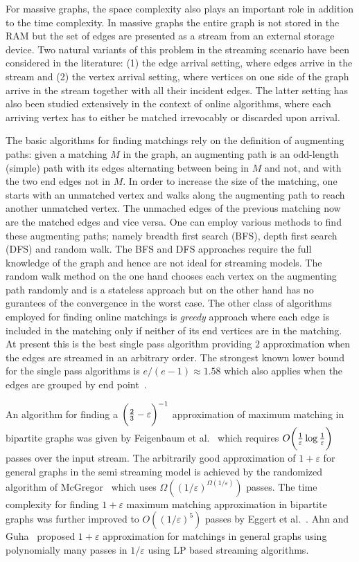 For massive graphs, the space complexity also plays an important role in addition to the time complexity. In massive graphs the entire graph is not stored in the RAM but the set of edges are presented as a stream from an external storage device. Two natural variants of this problem in the streaming scenario have been considered in the literature: (1) the edge arrival setting, where edges arrive in the stream and (2) the vertex arrival setting, where vertices on one
side of the graph arrive in the stream together with all their incident edges. The latter setting has also
been studied extensively in the context of online algorithms, where each arriving vertex has to either be
matched irrevocably or discarded upon arrival. 

The basic algorithms for finding matchings rely on the definition of augmenting paths:
given a matching $M$ in the graph, an augmenting path is an odd-length
(simple) path with its edges alternating between being in $M$
and not, and with the two end edges not in $M$. In order to increase the size of the matching, one starts with an unmatched vertex and walks along the augmenting path to reach another unmatched vertex. The unmached edges of the previous matching now are the matched edges and vice versa.
One can employ various methods to find these augmenting paths; namely breadth first search (BFS), depth first search (DFS) and random walk. The BFS and DFS approaches require the full knowledge of the graph and hence are not ideal for streaming models. The random walk method on the one hand chooses each vertex on the augmenting path randomly and is a stateless approach but on the other hand has no gurantees of the convergence in the worst case.
The other class of algorithms employed for finding online matchings is \emph{greedy} approach where each edge is included in the matching only if neither of its end vertices are in the matching. At present this is the best single pass algorithm providing $2$ approximation when the edges are streamed in an arbitrary order. The strongest known lower bound for the single pass algorithms is $e/(e-1)\approx 1.58$ which also applies when the edges are grouped by end point~\cite{boundsKap,Goel}.

An algorithm for finding a $\bigg( {2\over3}-\varepsilon \bigg)^{-1}$ approximation of maximum matching in bipartite graphs was given by Feigenbaum et al.~\cite{Feigenbaum05} which requires $O\bigg( {1\over \varepsilon}\log {1\over \varepsilon}\bigg)$ passes over the input stream. The arbitrarily good approximation of $1+\varepsilon$ for general graphs in the semi streaming model is achieved by the randomized algorithm of McGregor~\cite{McGregor05} which uses $\Omega((1/\varepsilon)^{\Omega(1/\varepsilon)})$ passes. The time complexity for finding $1+\varepsilon$ maximum matching approximation in bipartite graphs was further improved to $O((1/\varepsilon)^5)$ passes by Eggert et al.~\cite{EKMS11}. Ahn and Guha~\cite{AG11} proposed $1+\varepsilon$ approximation for matchings in general graphs using polynomially many passes in $1/\varepsilon$ using LP based streaming algorithms.

